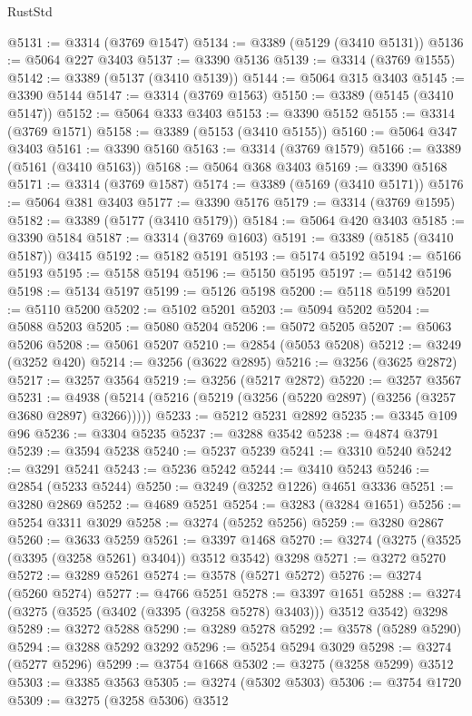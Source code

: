 \begin{lexlean}{RustStd}
\begin{coremodule}
@5131 := @3314 (@3769 @1547)
@5134 := @3389 (@5129 (@3410 @5131))
@5136 := @5064 @227 @3403
@5137 := @3390 @5136
@5139 := @3314 (@3769 @1555)
@5142 := @3389 (@5137 (@3410 @5139))
@5144 := @5064 @315 @3403
@5145 := @3390 @5144
@5147 := @3314 (@3769 @1563)
@5150 := @3389 (@5145 (@3410 @5147))
@5152 := @5064 @333 @3403
@5153 := @3390 @5152
@5155 := @3314 (@3769 @1571)
@5158 := @3389 (@5153 (@3410 @5155))
@5160 := @5064 @347 @3403
@5161 := @3390 @5160
@5163 := @3314 (@3769 @1579)
@5166 := @3389 (@5161 (@3410 @5163))
@5168 := @5064 @368 @3403
@5169 := @3390 @5168
@5171 := @3314 (@3769 @1587)
@5174 := @3389 (@5169 (@3410 @5171))
@5176 := @5064 @381 @3403
@5177 := @3390 @5176
@5179 := @3314 (@3769 @1595)
@5182 := @3389 (@5177 (@3410 @5179))
@5184 := @5064 @420 @3403
@5185 := @3390 @5184
@5187 := @3314 (@3769 @1603)
@5191 := @3389 (@5185 (@3410 @5187)) @3415
@5192 := @5182 @5191
@5193 := @5174 @5192
@5194 := @5166 @5193
@5195 := @5158 @5194
@5196 := @5150 @5195
@5197 := @5142 @5196
@5198 := @5134 @5197
@5199 := @5126 @5198
@5200 := @5118 @5199
@5201 := @5110 @5200
@5202 := @5102 @5201
@5203 := @5094 @5202
@5204 := @5088 @5203
@5205 := @5080 @5204
@5206 := @5072 @5205
@5207 := @5063 @5206
@5208 := @5061 @5207
@5210 := @2854 (@5053 @5208)
@5212 := @3249 (@3252 @420)
@5214 := @3256 (@3622 @2895)
@5216 := @3256 (@3625 @2872)
@5217 := @3257 @3564
@5219 := @3256 (@5217 @2872)
@5220 := @3257 @3567
@5231 := @4938 (@5214 (@5216 (@5219 (@3256 (@5220 @2897) (@3256 (@3257 @3680 @2897) @3266)))))
@5233 := @5212 @5231 @2892
@5235 := @3345 @109 @96
@5236 := @3304 @5235
@5237 := @3288 @3542
@5238 := @4874 @3791
@5239 := @3594 @5238
@5240 := @5237 @5239
@5241 := @3310 @5240
@5242 := @3291 @5241
@5243 := @5236 @5242
@5244 := @3410 @5243
@5246 := @2854 (@5233 @5244)
@5250 := @3249 (@3252 @1226) @4651 @3336
@5251 := @3280 @2869
@5252 := @4689 @5251
@5254 := @3283 (@3284 @1651)
@5256 := @5254 @3311 @3029
@5258 := @3274 (@5252 @5256)
@5259 := @3280 @2867
@5260 := @3633 @5259
@5261 := @3397 @1468
@5270 := @3274 (@3275 (@3525 (@3395 (@3258 @5261) @3404)) @3512 @3542) @3298
@5271 := @3272 @5270
@5272 := @3289 @5261
@5274 := @3578 (@5271 @5272)
@5276 := @3274 (@5260 @5274)
@5277 := @4766 @5251
@5278 := @3397 @1651
@5288 := @3274 (@3275 (@3525 (@3402 (@3395 (@3258 @5278) @3403))) @3512 @3542) @3298
@5289 := @3272 @5288
@5290 := @3289 @5278
@5292 := @3578 (@5289 @5290)
@5294 := @3288 @5292 @3292
@5296 := @5254 @5294 @3029
@5298 := @3274 (@5277 @5296)
@5299 := @3754 @1668
@5302 := @3275 (@3258 @5299) @3512
@5303 := @3385 @3563
@5305 := @3274 (@5302 @5303)
@5306 := @3754 @1720
@5309 := @3275 (@3258 @5306) @3512

\end{coremodule}
\end{lexlean}

